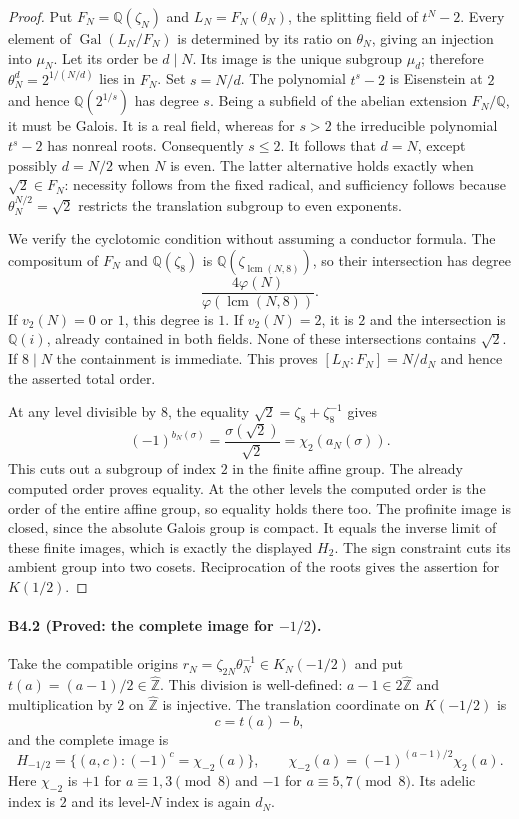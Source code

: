 \begin{proof}
Put $F_N=\mathbb Q(\zeta_N)$ and
$L_N=F_N(\theta_N)$, the splitting field of $t^N-2$.
Every element of $\operatorname{Gal}(L_N/F_N)$ is determined by its
ratio on $\theta_N$, giving an injection into $\mu_N$. Let its order
be $d\mid N$. Its image is the unique subgroup $\mu_d$; therefore
$\theta_N^d=2^{1/(N/d)}$ lies in $F_N$.
Set $s=N/d$. The polynomial $t^s-2$ is Eisenstein at $2$ and hence
$\mathbb Q(2^{1/s})$ has degree $s$. Being a subfield of the abelian
extension $F_N/\mathbb Q$, it must be Galois. It is a real field,
whereas for $s>2$ the irreducible polynomial $t^s-2$ has nonreal roots.
Consequently $s\leq2$. It follows that $d=N$, except possibly
$d=N/2$ when $N$ is even. The latter alternative holds exactly when
$\sqrt2\in F_N$: necessity follows from the fixed radical, and
sufficiency follows because $\theta_N^{N/2}=\sqrt2$ restricts the
translation subgroup to even exponents.

We verify the cyclotomic condition without assuming a conductor formula.
The compositum of $F_N$ and $\mathbb Q(\zeta_8)$ is
$\mathbb Q(\zeta_{\operatorname{lcm}(N,8)})$, so their intersection
has degree
\[
 \frac{4\varphi(N)}{\varphi(\operatorname{lcm}(N,8))}.
\]
If $v_2(N)=0$ or $1$, this degree is $1$. If $v_2(N)=2$, it is $2$
and the intersection is $\mathbb Q(i)$, already contained in both
fields. None of these intersections contains $\sqrt2$. If $8\mid N$
the containment is immediate. This proves
$[L_N:F_N]=N/d_N$ and hence the asserted total order.

At any level divisible by $8$, the equality
$\sqrt2=\zeta_8+\zeta_8^{-1}$ gives
\[
 (-1)^{b_N(\sigma)}
 =\frac{\sigma(\sqrt2)}{\sqrt2}
 =\chi_2(a_N(\sigma)).
\]
This cuts out a subgroup of index $2$ in the finite affine group.
The already computed order proves equality. At the other levels the
computed order is the order of the entire affine group, so equality
holds there too. The profinite image is closed, since the absolute
Galois group is compact. It equals the inverse limit of these finite
images, which is exactly the displayed $H_2$. The sign constraint
cuts its ambient group into two cosets. Reciprocation of the roots
gives the assertion for $K(1/2)$.
\end{proof}

\paragraph{B4.2 (Proved: the complete image for $-1/2$).}\label{B4.2}
Take the compatible origins
$r_N=\zeta_{2N}\theta_N^{-1}\in K_N(-1/2)$ and put
$t(a)=(a-1)/2\in\widehat{\mathbb Z}$. This division is well-defined:
$a-1\in2\widehat{\mathbb Z}$ and multiplication by $2$ on
$\widehat{\mathbb Z}$ is injective. The translation coordinate on
$K(-1/2)$ is
\[
 c=t(a)-b,
\]
and the complete image is
\[
 H_{-1/2}=\{(a,c):(-1)^c=\chi_{-2}(a)\},\qquad
 \chi_{-2}(a)=(-1)^{(a-1)/2}\chi_2(a).
\]
Here $\chi_{-2}$ is $+1$ for $a\equiv1,3\pmod8$ and $-1$ for
$a\equiv5,7\pmod8$. Its adelic index is $2$ and its level-$N$ index
is again $d_N$.

